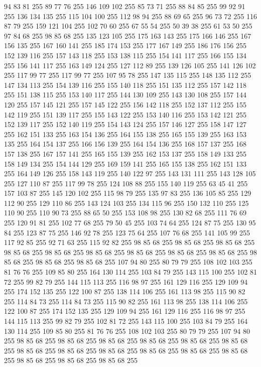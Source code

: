 94 83 81 255 89 77 76 255 146 109 102 255 85 73 71 255 88 84 85 255 99 92 91 255 136 134 135 255 115 104 100 255 112 98 94 255 88 69 65 255 96 73 72 255 116 87 79 255 159 121 104 255 102 70 60 255 67 55 54 255 50 39 38 255 61 53 50 255 97 84 68 255 98 85 68 255 135 123 105 255 175 163 143 255 175 166 146 255 167 156 135 255 167 160 141 255 185 174 153 255 177 167 149 255 186 176 156 255 152 139 116 255 157 143 118 255 153 138 115 255 154 141 117 255 166 155 134 255 156 141 117 255 163 149 124 255 127 112 89 255 139 126 105 255 141 126 102 255 117 99 77 255 117 99 77 255 107 95 78 255 147 135 115 255 148 135 112 255 147 134 113 255 154 139 116 255 155 140 118 255 151 135 112 255 157 142 118 255 151 138 115 255 153 140 117 255 144 130 109 255 143 130 108 255 157 144 120 255 157 145 121 255 157 145 122 255 156 142 118 255 152 137 112 255 155 142 119 255 151 139 117 255 155 143 122 255 153 140 116 255 153 142 121 255 152 139 117 255 152 140 119 255 154 143 124 255
157 146 127 255 158 147 127 255 162 151 133 255 163 154 136 255 164 155 138 255 165 155 139 255 163 153 135 255 164 154 137 255 166 156 139 255 164 154 136 255 168 157 137 255 168 157 138 255 167 157 141 255 165 155 139 255 162 153 137 255 158 149 133 255 158 149 134 255 154 144 129 255 169 159 141 255 165 155 138 255 162 151 133 255 164 149 126 255 158 143 119 255 140 122 97 255 143 131 111 255 143 128 105 255 127 110 87 255 117 99 78 255 124 108 88 255 155 140 119 255 63 45 41 255 157 103 87 255 145 120 102 255 115 98 79 255 135 97 83 255 136 105 85 255 129 112 90 255 129 110 86 255 143 124 103 255 134 115 96 255 150 132 110 255 125 110 90 255 110 90 73 255 88 65 50 255 153 108 98 255 130 82 68 255 111 76 69 255 120 91 81 255 102 77 68 255 79 50 45 255 103 74 64 255 124 87 75 255 130 95 84 255 123 87 75 255 146 92 78 255 123 75 64 255 107 76 68 255 141 105 99 255 117 92 85 255 92 71 63 255 115 92 82 255 98 85 68 255 98 85 68 255 98 85 68 255
98 85 68 255 98 85 68 255 98 85 68 255 98 85 68 255 98 85 68 255 98 85 68 255 98 85 68 255 98 85 68 255 98 85 68 255 107 94 80 255 80 79 79 255 108 102 103 255 81 76 76 255 109 85 80 255 164 130 114 255 103 84 79 255 143 115 100 255 102 81 72 255 99 82 79 255 144 115 113 255 116 98 97 255 161 129 116 255 129 109 94 255 174 152 135 255 122 100 87 255 138 114 106 255 161 113 98 255 115 90 82 255 114 84 73 255 114 84 73 255 115 90 82 255 161 113 98 255 138 114 106 255 122 100 87 255 174 152 135 255 129 109 94 255 161 129 116 255 116 98 97 255 144 115 113 255 99 82 79 255 102 81 72 255 143 115 100 255 103 84 79 255 164 130 114 255 109 85 80 255 81 76 76 255 108 102 103 255 80 79 79 255 107 94 80 255 98 85 68 255 98 85 68 255 98 85 68 255 98 85 68 255 98 85 68 255 98 85 68 255 98 85 68 255 98 85 68 255 98 85 68 255 98 85 68 255 98 85 68 255 98 85 68 255 98 85 68 255 98 85 68 255 98 85 68 255
